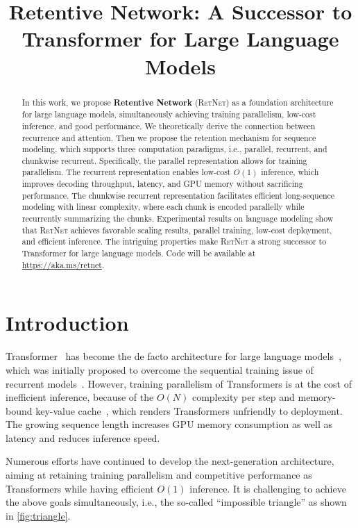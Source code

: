 \title{Retentive Network: A Successor to Transformer for Large Language Models}

\begin{abstract}
In this work, we propose \textbf{Retentive Network} (\textsc{RetNet}) as a foundation architecture for large language models, simultaneously achieving training parallelism, low-cost inference, and good performance. We theoretically derive the connection between recurrence and attention. Then we propose the retention mechanism for sequence modeling, which supports three computation paradigms, i.e., parallel, recurrent, and chunkwise recurrent. Specifically, the parallel representation allows for training parallelism. The recurrent representation enables low-cost $O(1)$ inference, which improves decoding throughput, latency, and GPU memory without sacrificing performance. The chunkwise recurrent representation facilitates efficient long-sequence modeling with linear complexity, where each chunk is encoded parallelly while recurrently summarizing the chunks. Experimental results on language modeling show that \textsc{RetNet} achieves favorable scaling results, parallel training, low-cost deployment, and efficient inference. The intriguing properties make \textsc{RetNet} a strong successor to Transformer for large language models. Code will be available at \url{https://aka.ms/retnet}.
\end{abstract}

\section{Introduction}
\label{sec:intro}

Transformer~\cite{transformer} has become the de facto architecture for large language models~\cite{gpt3}, which was initially proposed to overcome the sequential training issue of recurrent models~\cite{lstm}. However, training parallelism of Transformers is at the cost of inefficient inference, because of the $O(N)$ complexity per step and memory-bound key-value cache~\cite{multiquery}, which renders Transformers unfriendly to deployment. The growing sequence length increases GPU memory consumption as well as latency and reduces inference speed.

Numerous efforts have continued to develop the next-generation architecture, aiming at retaining training parallelism and competitive performance as Transformers while having efficient $O(1)$ inference. It is challenging to achieve the above goals simultaneously, i.e., the so-called ``impossible triangle'' as shown in \ref{fig:triangle}.

